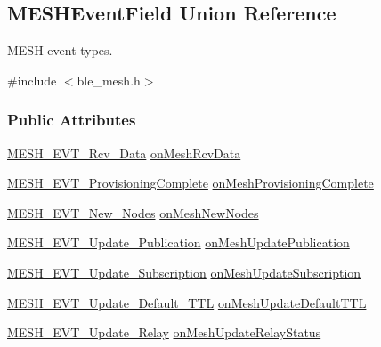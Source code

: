 \hypertarget{union_m_e_s_h_event_field}{}\subsection{M\+E\+S\+H\+Event\+Field Union Reference}
\label{union_m_e_s_h_event_field}


M\+E\+SH event types.  




{\ttfamily \#include $<$ble\+\_\+mesh.\+h$>$}

\subsubsection*{Public Attributes}
\begin{DoxyCompactItemize}
\item 
\hyperlink{struct_m_e_s_h___e_v_t___rcv___data}{M\+E\+S\+H\+\_\+\+E\+V\+T\+\_\+\+Rcv\+\_\+\+Data} \hyperlink{union_m_e_s_h_event_field_a2951bfbe3323c0a76789ee12461eecbb}{on\+Mesh\+Rcv\+Data}
\item 
\hyperlink{struct_m_e_s_h___e_v_t___provisioning_complete}{M\+E\+S\+H\+\_\+\+E\+V\+T\+\_\+\+Provisioning\+Complete} \hyperlink{union_m_e_s_h_event_field_ac0f8b3877ff353815af390f6b7f92871}{on\+Mesh\+Provisioning\+Complete}
\item 
\hyperlink{struct_m_e_s_h___e_v_t___new___nodes}{M\+E\+S\+H\+\_\+\+E\+V\+T\+\_\+\+New\+\_\+\+Nodes} \hyperlink{union_m_e_s_h_event_field_a2f80224524c873c5dd9c7d4e83d5535b}{on\+Mesh\+New\+Nodes}
\item 
\hyperlink{struct_m_e_s_h___e_v_t___update___publication}{M\+E\+S\+H\+\_\+\+E\+V\+T\+\_\+\+Update\+\_\+\+Publication} \hyperlink{union_m_e_s_h_event_field_a0c313b0969b5296112f23a352b7f1145}{on\+Mesh\+Update\+Publication}
\item 
\hyperlink{struct_m_e_s_h___e_v_t___update___subscription}{M\+E\+S\+H\+\_\+\+E\+V\+T\+\_\+\+Update\+\_\+\+Subscription} \hyperlink{union_m_e_s_h_event_field_a383d8787001995c25a19f960d9928ce6}{on\+Mesh\+Update\+Subscription}
\item 
\hyperlink{struct_m_e_s_h___e_v_t___update___default___t_t_l}{M\+E\+S\+H\+\_\+\+E\+V\+T\+\_\+\+Update\+\_\+\+Default\+\_\+\+T\+TL} \hyperlink{union_m_e_s_h_event_field_a0e704c9170129c99606ee62a60fb75d1}{on\+Mesh\+Update\+Default\+T\+TL}
\item 
\hyperlink{struct_m_e_s_h___e_v_t___update___relay}{M\+E\+S\+H\+\_\+\+E\+V\+T\+\_\+\+Update\+\_\+\+Relay} \hyperlink{union_m_e_s_h_event_field_af68544f8b6e88e0faba7cae025c7df4e}{on\+Mesh\+Update\+Relay\+Status}
\end{DoxyCompactItemize}


